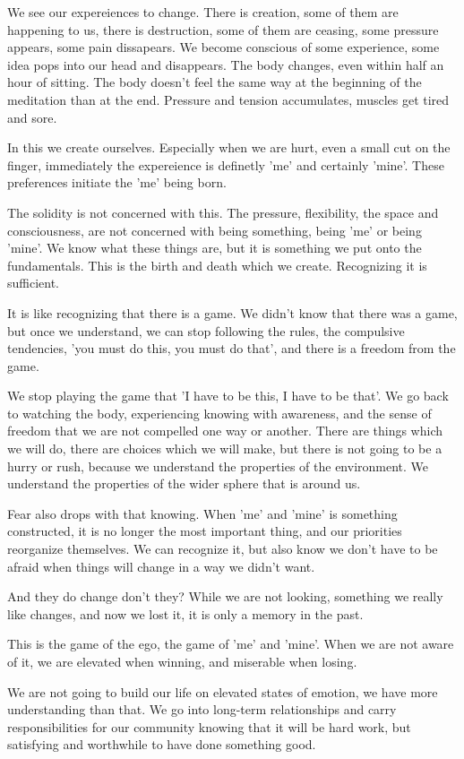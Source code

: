 We see our expereiences to change. There is creation, some of them are
happening to us, there is destruction, some of them are ceasing, some
pressure appears, some pain dissapears. We become conscious of some
experience, some idea pops into our head and disappears. The body
changes, even within half an hour of sitting. The body doesn't feel the
same way at the beginning of the meditation than at the end. Pressure
and tension accumulates, muscles get tired and sore.

In this we create ourselves. Especially when we are hurt, even a small
cut on the finger, immediately the expereience is definetly 'me' and
certainly 'mine'. These preferences initiate the 'me' being born.

The solidity is not concerned with this. The pressure, flexibility, the
space and consciousness, are not concerned with being something, being
'me' or being 'mine'. We know what these things are, but it is something
we put onto the fundamentals. This is the birth and death which we
create. Recognizing it is sufficient.

It is like recognizing that there is a game. We didn't know that there
was a game, but once we understand, we can stop following the rules, the
compulsive tendencies, 'you must do this, you must do that', and there
is a freedom from the game.

We stop playing the game that 'I have to be this, I have to be that'. We
go back to watching the body, experiencing knowing with awareness, and
the sense of freedom that we are not compelled one way or another. There
are things which we will do, there are choices which we will make, but
there is not going to be a hurry or rush, because we understand the
properties of the environment. We understand the properties of the wider
sphere that is around us.

Fear also drops with that knowing. When 'me' and 'mine' is something
constructed, it is no longer the most important thing, and our
priorities reorganize themselves. We can recognize it, but also know we
don't have to be afraid when things will change in a way we didn't want.

And they do change don't they? While we are not looking, something we
really like changes, and now we lost it, it is only a memory in the
past.

This is the game of the ego, the game of 'me' and 'mine'. When we are
not aware of it, we are elevated when winning, and miserable when
losing.

We are not going to build our life on elevated states of emotion, we
have more understanding than that. We go into long-term relationships
and carry responsibilities for our community knowing that it will be
hard work, but satisfying and worthwhile to have done something good.

